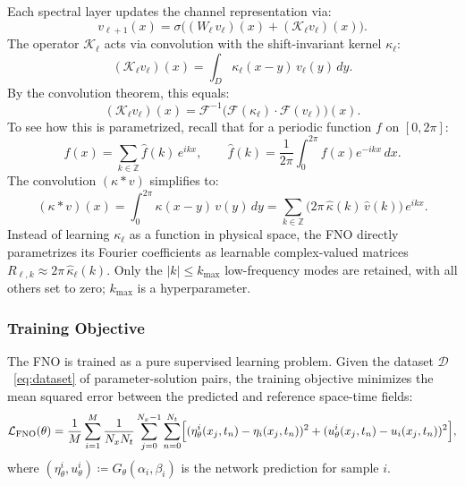 Each spectral layer updates the channel representation via:
\begin{equation}
    v_{\ell+1}(x) = \sigma \Big( (W_\ell\,v_\ell)(x) + (\mathcal{K}_\ell v_\ell)(x) \Big).
\end{equation}
The operator $\mathcal{K}_\ell$ acts via convolution with the shift-invariant kernel $\kappa_\ell$:
\begin{equation}
    (\mathcal{K}_\ell v_\ell)(x) = \int_{D} \kappa_\ell(x-y)\,v_\ell(y)\,dy.
\end{equation}
By the convolution theorem, this equals:
\begin{equation}
    (\mathcal{K}_\ell v_\ell)(x) = \mathcal{F}^{-1} \Big( \mathcal{F}(\kappa_\ell) \cdot \mathcal{F}(v_\ell) \Big)(x).
    \label{eq:fno_approximation}
\end{equation}
To see how this is parametrized, recall that for a periodic function $f$ on $[0, 2\pi]$:
\begin{equation}
    f(x) = \sum_{k \in \mathbb{Z}} \hat{f}(k) \, e^{ikx}, \qquad \hat{f}(k) = \frac{1}{2\pi} \int_0^{2\pi} f(x) e^{-ikx} \,dx.
\end{equation}
The convolution $(\kappa * v)$ simplifies to:
\begin{equation}
    (\kappa * v)(x) = \int_0^{2\pi} \kappa(x-y)\, v(y)\, dy
    = \sum_{k \in \mathbb{Z}} \bigl(2\pi\, \hat{\kappa}(k)\, \hat{v}(k)\bigr)\, e^{ikx}.
\end{equation}
Instead of learning $\kappa_\ell$ as a function in physical space, the FNO directly parametrizes its Fourier coefficients as learnable complex-valued matrices $R_{\ell,k} \approx 2\pi\,\hat{\kappa}_\ell(k)$. Only the $|k| \le k_{\max}$ low-frequency modes are retained, with all others set to zero; $k_{\max}$ is a hyperparameter.

\subsubsection{Training Objective}
\label{subsubsec:fno_loss}

The FNO is trained as a pure supervised learning problem. Given the dataset $\mathcal{D}$~\eqref{eq:dataset} of parameter-solution pairs, the training objective minimizes the mean squared error between the predicted and reference space-time fields:
\begin{equation}\label{eq:fno_loss}
    \mathcal{L}_{\text{FNO}}(\theta) = \frac{1}{M}\sum_{i=1}^{M}\frac{1}{N_x N_t}\sum_{j=0}^{N_x-1}\sum_{n=0}^{N_t}
    \Bigl[(\eta_\theta^i(x_j,t_n) - \eta_i(x_j,t_n))^2
    + (u_\theta^i(x_j,t_n) - u_i(x_j,t_n))^2\Bigr],
\end{equation}
where $(\eta_\theta^i, u_\theta^i) \coloneqq G_\theta(\alpha_i, \beta_i)$ is the network prediction for sample $i$.

